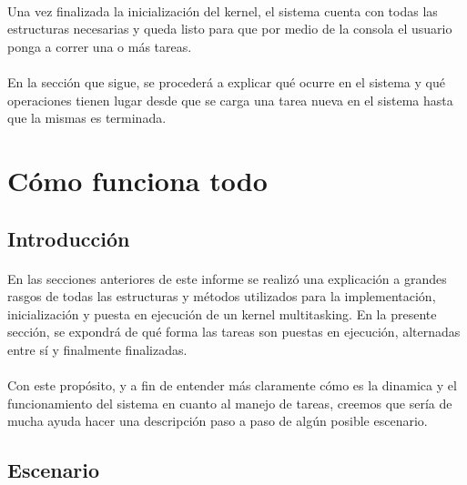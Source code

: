 \documentclass[11pt, a4paper]{article}
\begin{document}
	\paragraph{}
	Una vez finalizada la inicialización del kernel, el sistema cuenta con todas las estructuras necesarias y queda listo para que por medio de la consola el usuario ponga a correr una o más tareas.
	
	\paragraph{}
	En la sección que sigue, se procederá a explicar qué ocurre en el sistema y qué operaciones tienen lugar desde que se carga una tarea nueva en el sistema hasta que la mismas es terminada.

\section{Cómo funciona todo}
\subsection{Introducción}
	\paragraph{}
	En las secciones anteriores de este informe se realizó una explicación a grandes rasgos de todas las estructuras y métodos utilizados para la implementación, inicialización y puesta en ejecución de un kernel multitasking. En la presente sección, se expondrá de qué forma las tareas son puestas en ejecución, alternadas entre sí y finalmente finalizadas.
	
	\paragraph{}
	Con este propósito, y a fin de entender más claramente cómo es la dinamica y el funcionamiento del sistema en cuanto al manejo de tareas, creemos que sería de mucha ayuda hacer una descripción paso a paso de algún posible escenario.

	\subsection{Escenario}
\end{document}
